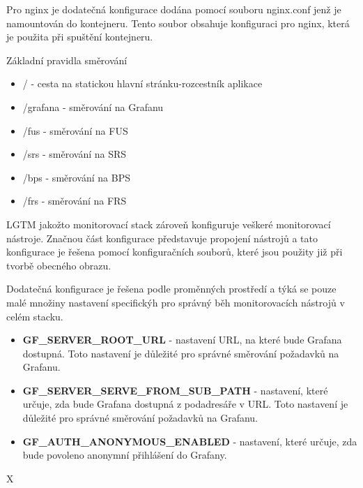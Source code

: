 
Pro nginx je dodatečná konfigurace dodána pomocí souboru nginx.conf jenž je namountován do kontejneru. Tento soubor obsahuje konfiguraci pro nginx, která je použita při spuštění kontejneru.

Základní pravidla směrování

\begin{itemize}
    \item / - cesta na statickou hlavní stránku-rozcestník aplikace
    \item /grafana - směrování na Grafanu
    \item /fus - směrování na FUS
    \item /srs - směrování na SRS
    \item /bps - směrování na BPS
    \item /frs - směrování na FRS
\end{itemize}


LGTM jakožto monitorovací stack zároveň konfiguruje veškeré monitorovací nástroje. Značnou část konfigurace představuje propojení nástrojů a tato konfigurace je řešena pomocí konfiguračních souborů, které jsou použity již při tvorbě obecného obrazu.

Dodatečná konfigurace je řešena podle proměnných prostředí a týká se pouze malé množiny nastavení specifickýh pro správný běh monitorovacích nástrojů v celém stacku.

\begin{itemize}
    \item \textbf{GF\_SERVER\_ROOT\_URL} - nastavení URL, na které bude Grafana dostupná. Toto nastavení je důležité pro správné směrování požadavků na Grafanu.
    \item \textbf{GF\_SERVER\_SERVE\_FROM\_SUB\_PATH} - nastavení, které určuje, zda bude Grafana dostupná z podadresáře v URL. Toto nastavení je důležité pro správné směrování požadavků na Grafanu.
    \item \textbf{GF\_AUTH\_ANONYMOUS\_ENABLED} - nastavení, které určuje, zda bude povoleno anonymní přihlášení do Grafany.
\end{itemize}


X




